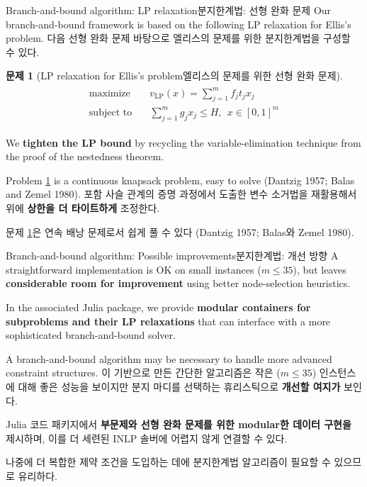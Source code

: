 \documentclass[11pt,mathserif,notheorems]{beamer}
\theoremstyle{definition}
\newtheorem{problem}{Problem}
\theoremstyle{definition}
\newtheorem{problem}{문제}
\begin{document}
\begin{frame}{\ifen Branch-and-bound algorithm: LP relaxation\else 분지한계법: 선형 완화 문제\fi}
\ifen
Our branch-and-bound framework is based on the following LP relaxation for Ellis's problem. 
\else
다음 선형 완화 문제 바탕으로 엘리스의 문제를 위한 분지한계법을 구성할 수 있다. 
\fi
\begin{problem}[\ifen LP relaxation for Ellis's problem\else 엘리스의 문제를 위한 선형 완화 문제\fi]\label{LPrelaxation}
\vspace{-2em}
\begin{align*}
\begin{split}
\text{maximize}\quad &  v_{\mathrm{LP}}(x) = \sum_{j=1}^m  f_j t_j x_j \\
\text{subject to}\quad & \sum_{j=1}^m g_j x_j \leq H, ~~ x \in [0, 1]^m
\end{split}
\end{align*}
\end{problem}
\ifen
We \textbf{tighten the LP bound} by recycling the variable-elimination technique from the proof of the nestedness theorem.

Problem \ref{LPrelaxation} is a continuous knapsack problem, easy to solve (Dantzig 1957; Balas and Zemel 1980). 
\else
포함 사슬 관계의 증명 과정에서 도출한 변수 소거법을 재활용해서 위에 \textbf{상한을 더 타이트하게} 조정한다.

문제 \ref{LPrelaxation}은 연속 배낭 문제로서 쉽게 풀 수 있다 (Dantzig 1957; Balas와 Zemel 1980). 
\fi
\end{frame}






\begin{frame}{\ifen Branch-and-bound algorithm: Possible improvements\else 분지한계법: 개선 방향\fi}
\ifen
A straightforward implementation is OK on small instances ($m \leq 35$), but leaves \textbf{considerable room for improvement} using better node-selection heuristics.


In the associated Julia package, we provide \textbf{modular containers for subproblems and their LP relaxations} that can interface with a more sophisticated branch-and-bound solver.

A branch-and-bound algorithm may be necessary to handle more advanced constraint structures.
\else
이 기반으로 만든 간단한 알고리즘은 작은 ($m \leq 35$) 인스턴스에 대해 좋은 성능을 보이지만 분지 마디를 선택하는 휴리스틱으로 \textbf{개선할 여지가} 보인다.

Julia 코드 패키지에서 \textbf{부문제와 선형 완화 문제를 위한 modular한 데이터 구현을} 제시하며, 이를 더 세련된 INLP 솔버에 어렵지 않게 연결할 수 있다.

나중에 더 복합한 제약 조건을 도입하는 데에 분지한계법 알고리즘이 필요할 수 있으므로 유리하다.
\fi
\end{frame}
\end{document}
